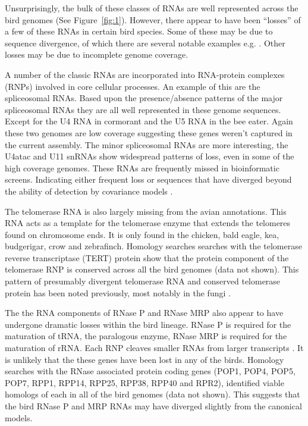 \documentclass[10pt]{bmc_article}
\newenvironment{bmcformat}{\begin{raggedright}\baselineskip20pt\sloppy\setboolean{publ}{false}}{\end{raggedright}\baselineskip20pt\sloppy}
\begin{document}
\begin{bmcformat}
Unsurprisingly, the bulk of these classes of RNAs are well represented
across the bird genomes (See Figure~\ref{fig:1}). However, there
appear to have been ``losses'' of a few of these RNAs in certain bird
species. Some of these may be due to sequence divergence, of which
there are several notable examples e.g.
\cite{Leonardi:2008,Webb:2008,Mao:,Lai:2010,Chan:2011}. Other losses
may be due to incomplete genome coverage.

A number of the classic RNAs are incorporated into RNA-protein
complexes (RNPs) involved in core cellular processes. An example of
this are the spliceosomal RNAs. Based upon the presence/absence
patterns of the major spliceosomal RNAs they are all well represented
in these genome sequences. Except for the U4 RNA in cormorant and the
U5 RNA in the bee eater. Again these two genomes are low coverage
suggesting these genes weren't captured in the current assembly. The
minor spliceosomal RNAs are more interesting, the U4atac and U11
snRNAs show widespread patterns of loss, even in some of the high
coverage genomes. These RNAs are frequently missed in bioinformatic
screens. Indicating either frequent loss \cite{Davila_Lopez:2008} or
sequences that have diverged beyond the ability of detection by
covariance models \cite{Marz:2008}.

The telomerase RNA is also largely missing from the avian
annotations. This RNA acts as a template for the telomerase enzyme
that extends the telomeres found on chromosome ends. It is only found
in the chicken, bald eagle, kea, budgerigar, crow and
zebrafinch. Homology searches searches with the telomerase reverse
transcriptase (TERT) protein show that the protein component of the
telomerase RNP is conserved across all the bird genomes (data not
shown). This pattern of presumably divergent telomerase RNA and
conserved telomerase protein has been noted previously, most notably
in the fungi \cite{Leonardi:2008,Webb:2008}.

The the RNA components of RNase P and RNase MRP also appear to have
undergone dramatic losses within the bird lineage. RNase P is required
for the maturation of tRNA, the paralogous enzyme, RNase MRP is
required for the maturation of rRNA. Each RNP cleaves smaller RNAs
from larger transcripts \cite{Lopez:2009}. It is unlikely that the
these genes have been lost in any of the birds. Homology searches with
the RNase associated protein coding genes (POP1, POP4, POP5, POP7,
RPP1, RPP14, RPP25, RPP38, RPP40 and RPR2), identified viable homologs
of each in all of the bird genomes \cite{Rosenblad:2006} (data not
shown). This suggests that the bird RNase P and MRP RNAs may have
diverged slightly from the canonical models.


\end{bmcformat}
\end{document}
